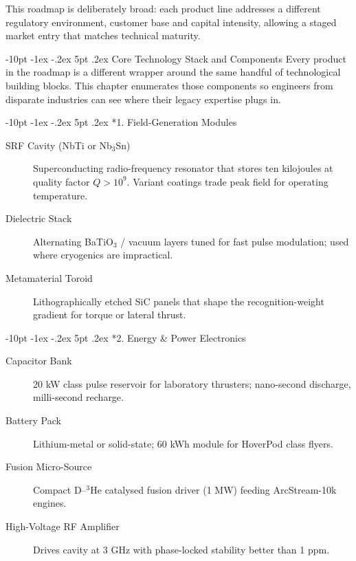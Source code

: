 \documentclass[12pt,letterpaper]{book}
\makeatletter
\renewcommand\section{\@startsection{section}{1}{\z@}%
  {-8pt \@plus -1ex \@minus -.2ex}%
  {4pt \@plus.2ex}%
  {\normalfont\large\bfseries}}
\renewcommand\section{\@startsection {section}{1}{\z@}%
                {-10pt \@plus -1ex \@minus -.2ex}%
                {5pt \@plus.2ex}%
                {\normalfont\large\bfseries}}
\makeatother
\begin{document}
This roadmap is deliberately broad: each product line addresses a different regulatory environment, customer base and capital intensity, allowing a staged market entry that matches technical maturity.

\section{Core Technology Stack and Components}\label{chap:components}
Every product in the roadmap is a different wrapper around the same handful of technological building blocks.  This chapter enumerates those components so engineers from disparate industries can see where their legacy expertise plugs in.

\section*{1. Field-Generation Modules}
\begin{description}
 \item[SRF Cavity (NbTi or Nb$_3$Sn)] Superconducting radio-frequency resonator that stores ten kilojoules at quality factor $Q>10^{9}$.  Variant coatings trade peak field for operating temperature.
 \item[Dielectric Stack] Alternating BaTiO$_3$ / vacuum layers tuned for fast pulse modulation; used where cryogenics are impractical.
 \item[Metamaterial Toroid] Lithographically etched SiC panels that shape the recognition-weight gradient for torque or lateral thrust.
\end{description}

\section*{2. Energy & Power Electronics}
\begin{description}
 \item[Capacitor Bank] 20 kW class pulse reservoir for laboratory thrusters; nano-second discharge, milli-second recharge.
 \item[Battery Pack] Lithium-metal or solid-state; 60 kWh module for HoverPod class flyers.
 \item[Fusion Micro-Source] Compact D–$^3$He catalysed fusion driver (1 MW) feeding ArcStream-10k engines.
 \item[High-Voltage RF Amplifier] Drives cavity at 3 GHz with phase-locked stability better than 1 ppm.
\end{description}
\end{document}
